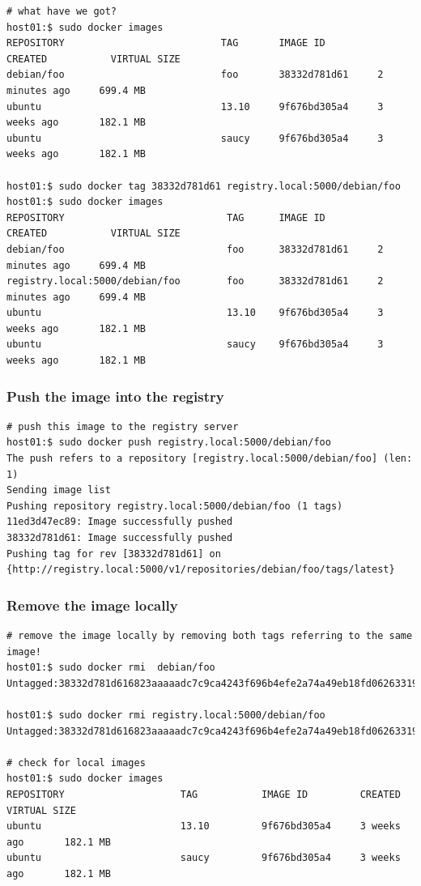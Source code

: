 \documentclass[captions=tableheading]{article}
\begin{document}
\begin{verbatim}
# what have we got?
host01:$ sudo docker images
REPOSITORY                           TAG       IMAGE ID         CREATED           VIRTUAL SIZE
debian/foo                           foo       38332d781d61     2 minutes ago     699.4 MB
ubuntu                               13.10     9f676bd305a4     3 weeks ago       182.1 MB
ubuntu                               saucy     9f676bd305a4     3 weeks ago       182.1 MB

host01:$ sudo docker tag 38332d781d61 registry.local:5000/debian/foo
host01:$ sudo docker images 
REPOSITORY                            TAG      IMAGE ID         CREATED           VIRTUAL SIZE
debian/foo                            foo      38332d781d61     2 minutes ago     699.4 MB
registry.local:5000/debian/foo        foo      38332d781d61     2 minutes ago     699.4 MB
ubuntu                                13.10    9f676bd305a4     3 weeks ago       182.1 MB
ubuntu                                saucy    9f676bd305a4     3 weeks ago       182.1 MB
\end{verbatim}
\subsubsection{Push the image into the registry}
\label{sec-3-7-2}


\begin{verbatim}
# push this image to the registry server
host01:$ sudo docker push registry.local:5000/debian/foo
The push refers to a repository [registry.local:5000/debian/foo] (len: 1)
Sending image list
Pushing repository registry.local:5000/debian/foo (1 tags)
11ed3d47ec89: Image successfully pushed 
38332d781d61: Image successfully pushed 
Pushing tag for rev [38332d781d61] on {http://registry.local:5000/v1/repositories/debian/foo/tags/latest}
\end{verbatim}
\subsubsection{Remove the image locally}
\label{sec-3-7-3}


\begin{verbatim}
# remove the image locally by removing both tags referring to the same image!
host01:$ sudo docker rmi  debian/foo
Untagged:38332d781d616823aaaaadc7c9ca4243f696b4efe2a74a49eb18fd062633198d

host01:$ sudo docker rmi registry.local:5000/debian/foo
Untagged:38332d781d616823aaaaadc7c9ca4243f696b4efe2a74a49eb18fd062633198d

# check for local images
host01:$ sudo docker images
REPOSITORY                    TAG           IMAGE ID         CREATED           VIRTUAL SIZE
ubuntu                        13.10         9f676bd305a4     3 weeks ago       182.1 MB
ubuntu                        saucy         9f676bd305a4     3 weeks ago       182.1 MB
\end{verbatim}
\end{document}
